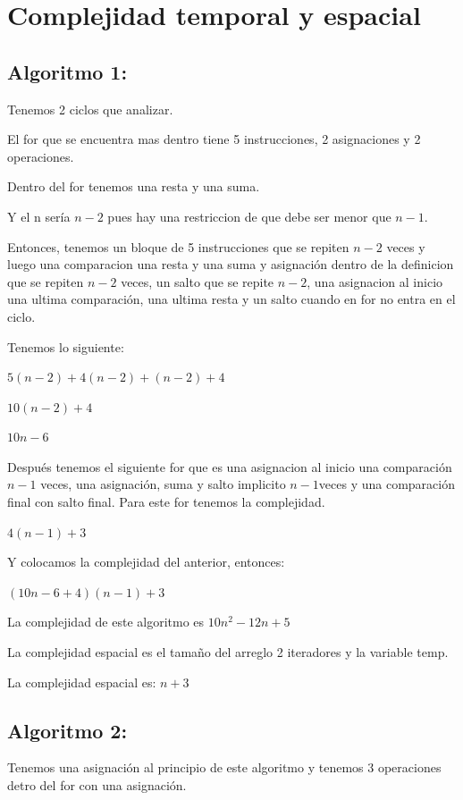 \documentclass[12pt, fleqn]{article}                             %
\theoremstyle{break}                                            %
\begin{document}
\section{Complejidad temporal y espacial}
    \subsection{Algoritmo 1:}
    

    Tenemos 2 ciclos que analizar.

    El for que se encuentra mas dentro tiene 5 instrucciones, 2 asignaciones y 2 operaciones. 

    Dentro del for tenemos una resta y una suma.

    Y el n sería $n-2$ pues hay una restriccion de que debe ser menor que $n-1$.

    Entonces, tenemos un bloque de 5 instrucciones que se repiten $n-2$ veces y luego una comparacion una resta y una suma y asignación dentro de la definicion que se repiten $n-2$ veces, un salto que se repite $n-2$, una asignacion al inicio una ultima comparación, una ultima resta y un salto cuando en for no entra en el ciclo.

    Tenemos lo siguiente:

    $5(n-2)+4(n-2)+(n-2)+4$

    $10(n-2)+4$

    $10n-6$

    Después tenemos el siguiente for que es una asignacion al inicio una comparación $n-1$ veces, una asignación, suma y salto implicito $n-1$veces y una comparación final con salto final.
    Para este for tenemos la complejidad.


    $4(n-1)+3$


    Y colocamos la complejidad del anterior, entonces:

    $(10n-6+4)(n-1)+3$


    La complejidad de este algoritmo es $10n^{2}-12n+5$

    La complejidad espacial es el tamaño del arreglo 2 iteradores y la variable temp.

    La complejidad espacial es: $n+3$

    \subsection{Algoritmo 2:}
    

    Tenemos una asignación al principio de este algoritmo
    y tenemos 3 operaciones detro del for con una asignación.
\end{document}
